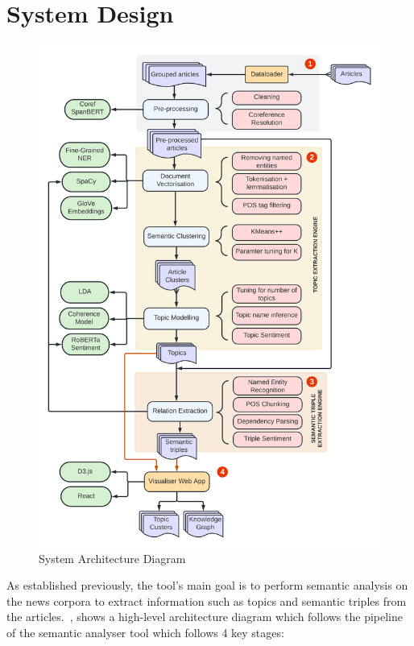 \section{System Design}

\begin{figure}[H]
\centering
\includegraphics[width=0.8\linewidth]{images/system_arch.png}
\caption{System Architecture Diagram}
\label{fig:sys_arch}
\end{figure}
As established previously, the tool's main goal is to perform semantic analysis on the news corpora to extract information such as topics and semantic triples from the articles.~, shows a high-level architecture diagram which follows the pipeline of the semantic analyser tool which follows 4 key stages: 


